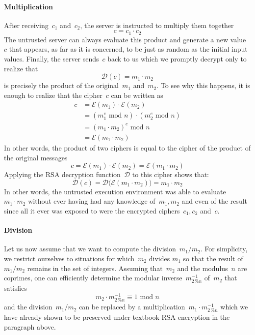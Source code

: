 \documentclass{article}
\begin{document}
\paragraph{Multiplication}  After receiving~$c_1$ and~$c_2$, the server is instructed to multiply them together
\begin{equation*}
c = c_1 \cdot c_2
\end{equation*}
The untrusted server can always evaluate this product and generate a new value~$c$ that appears, as far as it is concerned, to be just as random as the initial input values.  Finally, the server sends~$c$ back to us which we promptly decrypt only to realize that
\begin{equation*}
\mathcal{D}(c) = m_1 \cdot m_2    
\end{equation*}
is precisely the product of the original~$m_1$ and~$m_2$.  To see why this happens, it is enough to realize that the cipher~$c$ can be written as
\begin{align*}
c &= \mathcal{E}(m_1) \cdot \mathcal{E}(m_2) \\
&= \left( m_1^e \,\,\text{mod}\,\,n  \right) \cdot \left( m_2^e \,\,\text{mod}\,\,n  \right) \\
&= \left( m_1 \cdot m_2 \right)^e \,\,\text{mod}\,\,n \\
&= \mathcal{E}(m_1 \cdot m_2)
\end{align*}
In other words, the product of two ciphers is equal to the cipher of the product of the original messages
\begin{equation*}
c = \mathcal{E}(m_1) \cdot \mathcal{E}(m_2) = \mathcal{E}(m_1 \cdot m_2)
\end{equation*}
Applying the RSA decryption function~$\mathcal{D}$ to this cipher shows that:
\begin{equation*}
\mathcal{D}(c) = \mathcal{D} \big( \mathcal{E} (m_1 \cdot m_2 )  \big) = m_1 \cdot m_2
\end{equation*}
In other words, the untrusted execution environment was able to evaluate~$m_1\cdot m_2$ without ever having had any knowledge of~$m_1, m_2$ and even of the result since all it ever was exposed to were the encrypted ciphers~$c_1, c_2$ and~$c$.

\paragraph{Division}  Let us now assume that we want to compute the division~$m_1 / m_2$.  For simplicity, we restrict ourselves to situations for which~$m_2$ divides $m_1$ so that the result of~$m_1 / m_2$ remains in the set of integers.  Assuming that~$m_2$ and the modulus~$n$ are coprimes, one can efficiently determine the modular inverse~$m^{-1}_{2 \, \%n}$ of~$m_2$ that satisfies
\begin{equation*}
m_2 \cdot m^{-1}_{2 \, \%n} \equiv 1 \,\,\text{mod}\,\,n
\end{equation*}
and the division~$m_1 / m_2$ can be replaced by a multiplication~$m_1 \cdot m^{-1}_{2 \, \%n}$ which we have already shown to be preserved under textbook RSA encryption in the paragraph above.
\end{document}
